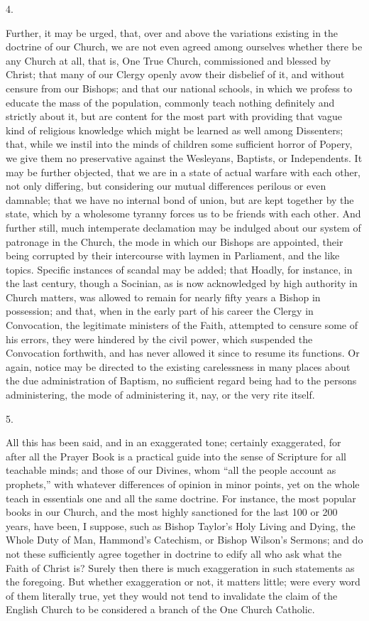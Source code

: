 4.

Further, it may be urged, that, over and above the variations
existing in the doctrine of our Church, we are not even agreed among
ourselves whether there be any Church at all, that is, One True
Church, commissioned and blessed by Christ; that many of our Clergy
openly avow their disbelief of it, and without censure from our
Bishops; and that our national schools, in which we profess to educate
the mass of the population, commonly teach nothing definitely and
strictly about it, but are content for the most part with providing
that vague kind of religious knowledge which might be learned as well
among Dissenters; that, while we instil into the minds of children
some sufficient horror of Popery, we give them no preservative against
the Wesleyans, Baptists, or Independents. It may be further objected,
that we are in a state of actual warfare with each other, not only
differing, but considering our mutual differences perilous or even
damnable; that we have no internal bond of union, but are kept
together by the state, which by a wholesome tyranny forces us to be
friends with each other. And further still, much intemperate
declamation may be indulged about our system of patronage in the
Church, the mode in which our Bishops are appointed, their being
corrupted by their intercourse with laymen in Parliament, and the like
topics. Specific instances of scandal may be added; that Hoadly,
for instance, in the last century, though a Socinian, as is now
acknowledged by high authority in Church matters, was allowed to
remain for nearly fifty years a Bishop in possession; and that, when
in the early part of his career the Clergy in Convocation, the
legitimate ministers of the Faith, attempted to censure some of his
errors, they were hindered by the civil power, which suspended the
Convocation forthwith, and has never allowed it since to resume its
functions. Or again, notice may be directed to the existing
carelessness in many places about the due administration of Baptism,
no sufficient regard being had to the persons administering, the mode
of administering it, nay, or the very rite itself.

5.

All this has been said, and in an exaggerated tone; certainly
exaggerated, for after all the Prayer Book is a practical guide into
the sense of Scripture for all teachable minds; and those of our
Divines, whom ``all the people account as prophets,'' with
whatever differences of opinion in minor points, yet on the whole
teach in essentials one and all the same doctrine. For instance, the
most popular books in our Church, and the most highly sanctioned for
the last 100 or 200 years, have been, I suppose, such as Bishop Taylor's
Holy Living and Dying, the Whole Duty of Man, Hammond's Catechism, or
Bishop Wilson's Sermons; and do not these sufficiently agree together
in doctrine to edify all who ask what the Faith of Christ is? Surely
then there is much exaggeration in such statements as the foregoing.
But whether exaggeration or not, it matters little; were every word of
them literally true, yet they would not tend to invalidate the claim
of the English Church to be considered a branch of the One Church
Catholic.

